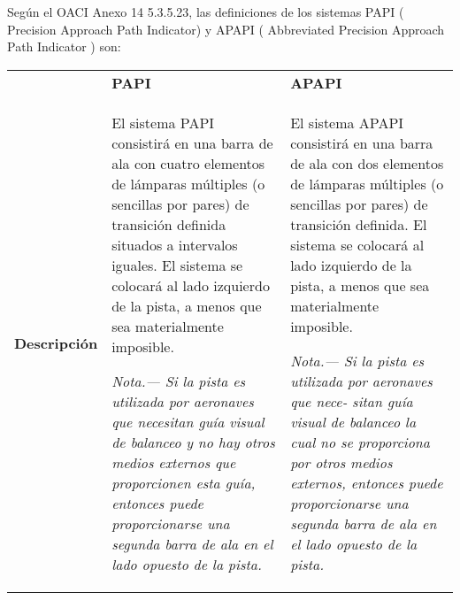 Seg\'un el OACI Anexo 14 5.3.5.23, las definiciones de los sistemas PAPI 
(	Precision Approach Path Indicator)
y APAPI 
(	Abbreviated Precision Approach Path Indicator )
son:

\begin{tabular}{m{}m{}m{}} \hline
	\rowcolor{yellow!30}
	& {\bf PAPI} & {\bf APAPI} \\
{\bf Descripci\'on} 
& El sistema PAPI consistirá en una barra de ala con
cuatro elementos de lámparas múltiples (o sencillas por pares)
de transición definida situados a intervalos iguales. El sistema
se colocará al lado izquierdo de la pista, a menos que sea
materialmente imposible.

{\it Nota.— Si la pista es utilizada por aeronaves que necesitan
guía visual de balanceo y no hay otros medios externos que
proporcionen esta guía, entonces puede proporcionarse una
segunda barra de ala en el lado opuesto de la pista.
}
  
& El sistema APAPI consistirá en una barra de ala
con dos elementos de lámparas múltiples (o sencillas por pares)
de transición definida. El sistema se colocará al lado izquierdo
de la pista, a menos que sea materialmente imposible.

{\it Nota.— Si la pista es utilizada por aeronaves que nece-
sitan guía visual de balanceo la cual no se proporciona
por otros medios externos, entonces puede proporcionarse
una segunda barra de ala en el lado opuesto de la pista.}

\\


\end{tabular}